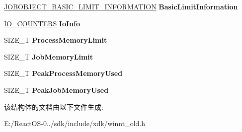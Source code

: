 \begin{DoxyCompactItemize}
\item 
\mbox{\label{struct___j_o_b_o_b_j_e_c_t___e_x_t_e_n_d_e_d___l_i_m_i_t___i_n_f_o_r_m_a_t_i_o_n_a07fcd54244a368d3f6e9aa4d196de855}} 
\hyperlink{struct___j_o_b_o_b_j_e_c_t___b_a_s_i_c___l_i_m_i_t___i_n_f_o_r_m_a_t_i_o_n}{J\+O\+B\+O\+B\+J\+E\+C\+T\+\_\+\+B\+A\+S\+I\+C\+\_\+\+L\+I\+M\+I\+T\+\_\+\+I\+N\+F\+O\+R\+M\+A\+T\+I\+ON} {\bfseries Basic\+Limit\+Information}
\item 
\mbox{\label{struct___j_o_b_o_b_j_e_c_t___e_x_t_e_n_d_e_d___l_i_m_i_t___i_n_f_o_r_m_a_t_i_o_n_a6d131d1dfb8ad70c1ed7e52954a7e28a}} 
\hyperlink{struct___i_o___c_o_u_n_t_e_r_s}{I\+O\+\_\+\+C\+O\+U\+N\+T\+E\+RS} {\bfseries Io\+Info}
\item 
\mbox{\label{struct___j_o_b_o_b_j_e_c_t___e_x_t_e_n_d_e_d___l_i_m_i_t___i_n_f_o_r_m_a_t_i_o_n_a5a124e74ecba0211466769328265e5f5}} 
S\+I\+Z\+E\+\_\+T {\bfseries Process\+Memory\+Limit}
\item 
\mbox{\label{struct___j_o_b_o_b_j_e_c_t___e_x_t_e_n_d_e_d___l_i_m_i_t___i_n_f_o_r_m_a_t_i_o_n_ae0736aa11a1380a1782b57cd6342fb6b}} 
S\+I\+Z\+E\+\_\+T {\bfseries Job\+Memory\+Limit}
\item 
\mbox{\label{struct___j_o_b_o_b_j_e_c_t___e_x_t_e_n_d_e_d___l_i_m_i_t___i_n_f_o_r_m_a_t_i_o_n_a800a37d7d8650116c10192bd0f5d40ef}} 
S\+I\+Z\+E\+\_\+T {\bfseries Peak\+Process\+Memory\+Used}
\item 
\mbox{\label{struct___j_o_b_o_b_j_e_c_t___e_x_t_e_n_d_e_d___l_i_m_i_t___i_n_f_o_r_m_a_t_i_o_n_a5ba0726d6fad55d3a2b7648a44580c72}} 
S\+I\+Z\+E\+\_\+T {\bfseries Peak\+Job\+Memory\+Used}
\end{DoxyCompactItemize}


该结构体的文档由以下文件生成\+:\begin{DoxyCompactItemize}
\item 
E\+:/\+React\+O\+S-\/0../sdk/include/xdk/winnt\+\_\+old.\+h\end{DoxyCompactItemize}
